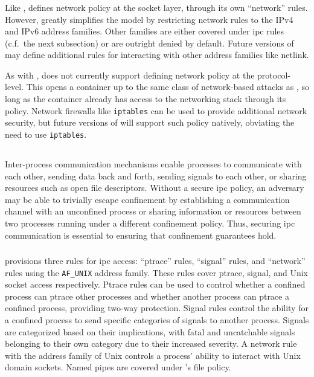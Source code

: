 \subsubsection{\bpfcontain{}}

Like \bpfbox{}, \bpfcontain{} defines network policy at the socket layer, through its own
\enquote{network} rules. However, \bpfcontain{} greatly simplifies the \bpfbox{} model by
restricting network rules to the IPv4 and IPv6 address families. Other families are either
covered under \gls{ipc} rules (c.f.\ the next subsection) or are outright denied by
default. Future versions of \bpfcontain{} may define additional rules for interacting with
other address families like netlink.

As with \bpfbox{}, \bpfcontain{} does not currently support defining network policy at the
protocol-level. This opens a \bpfcontain{} container up to the same class of network-based
attacks as \bpfbox{}, so long as the container already has access to the networking stack
through its \bpfcontain{} policy. Network firewalls like \texttt{iptables} can be used to
provide additional network security, but future versions of \bpfcontain{} will support
such policy natively, obviating the need to use \texttt{iptables}.

\subsection{}

Inter-process communication mechanisms enable processes to communicate with each other,
sending data back and forth, sending signals to each other, or sharing resources such as
open file descriptors. Without a secure \gls{ipc} policy, an adversary may be able to
trivially escape confinement by establishing a communication channel with an unconfined
process or sharing information or resources between two processes running under
a different confinement policy. Thus, securing \gls{ipc} communication is essential to
ensuring that confinement guarantees hold.

\subsubsection{\bpfbox{}}

\bpfbox{} provisions three rules for \gls{ipc} access: \enquote{ptrace} rules,
\enquote{signal} rules, and \enquote{network} rules using the \texttt{AF\_UNIX} address
family. These rules cover ptrace, signal, and Unix socket access respectively. Ptrace
rules can be used to control whether a confined process can ptrace other processes and
whether another process can ptrace a confined process, providing two-way protection.
Signal rules control the ability for a confined process to send specific categories of
signals to another process. Signals are categorized based on their implications, with
fatal and uncatchable signals belonging to their own category due to their increased
severity. A network rule with the address family of Unix controls a process' ability to interact
with Unix domain sockets. Named pipes are covered under \bpfbox{}'s file policy.

